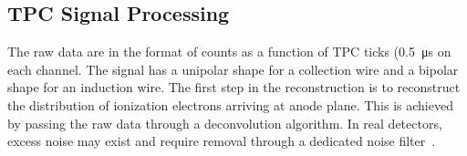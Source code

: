 
\subsection{TPC Signal Processing}\label{sec:tpc_sp}

The raw data are in the format of  counts as a function of TPC ticks (\SI{0.5}{\micro\second} on each channel. The signal has a 
unipolar shape for a collection wire and a bipolar shape for an induction wire. The first step 
in the reconstruction is to reconstruct the distribution of ionization electrons arriving at anode plane. 
This is achieved by passing the raw data through a deconvolution algorithm. In real detectors, excess 
noise may exist and require removal %
through a dedicated noise filter~\cite{Acciarri:2017sde}. 

